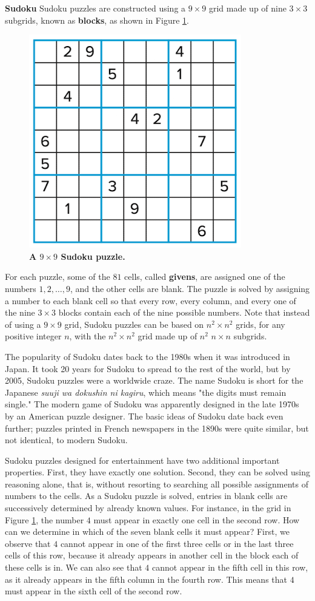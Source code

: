 \documentclass{Axon}
\begin{document}
\begin{example}
    \textbf{Sudoku} Sudoku puzzles are constructed using a \(9 \times 9\) grid made up of nine \(3 \times 3\) subgrids, known as \textbf{blocks}, as shown in Figure \ref{Figure: 2}.

    \begin{figure}[ht]
    \centering
    \includegraphics[width=0.25\linewidth]{Discrete Mathematics and its Applications, 8th Edition/Chapter 1 Logic and Proofs/Section 1.3 Propositional Equivalences/Figure 2.png}
    \caption{\textbf{A \(9 \times 9\) Sudoku puzzle.}}
    \label{Figure: 2}
    \end{figure}

    For each puzzle, some of the \(81\) cells, called \textbf{givens}, are assigned one of the numbers \(1, 2, \ldots, 9\), and the other cells are blank. The puzzle is solved by assigning a number to each blank cell so that every row, every column, and every one of the nine \(3 \times 3\) blocks contain each of the nine possible numbers. Note that instead of using a \(9 \times 9\) grid, Sudoku puzzles can be based on \(n^2 \times n^2\) grids, for any positive integer \(n\), with the \(n^2 \times n^2\) grid made up of \(n^2\) \(n \times n\) subgrids.

    The popularity of Sudoku dates back to the 1980s when it was introduced in Japan. It took 20 years for Sudoku to spread to the rest of the world, but by 2005, Sudoku puzzles were a worldwide craze. The name Sudoku is short for the Japanese \textit{suuji wa dokushin ni kagiru}, which means "the digits must remain single." The modern game of Sudoku was apparently designed in the late 1970s by an American puzzle designer. The basic ideas of Sudoku date back even further; puzzles printed in French newspapers in the 1890s were quite similar, but not identical, to modern Sudoku.

    Sudoku puzzles designed for entertainment have two additional important properties. First, they have exactly one solution. Second, they can be solved using reasoning alone, that is, without resorting to searching all possible assignments of numbers to the cells. As a Sudoku puzzle is solved, entries in blank cells are successively determined by already known values. For instance, in the grid in Figure \ref{Figure: 2}, the number \(4\) must appear in exactly one cell in the second row. How can we determine in which of the seven blank cells it must appear? First, we observe that \(4\) cannot appear in one of the first three cells or in the last three cells of this row, because it already appears in another cell in the block each of these cells is in. We can also see that \(4\) cannot appear in the fifth cell in this row, as it already appears in the fifth column in the fourth row. This means that \(4\) must appear in the sixth cell of the second row.


\end{example}
\end{document}
